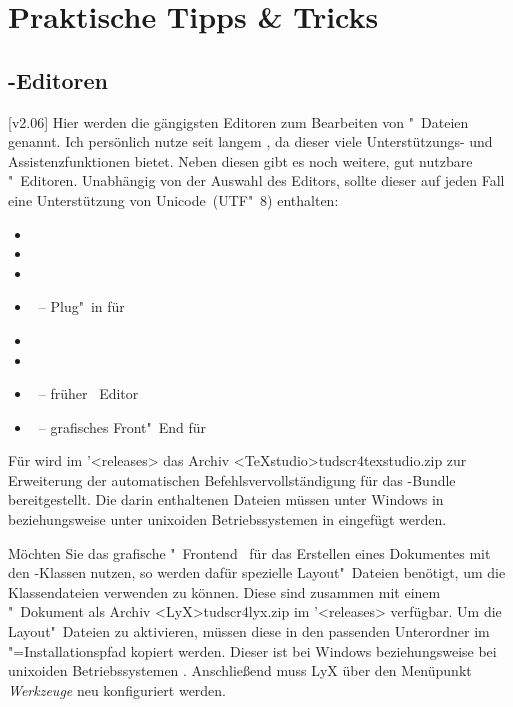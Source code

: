 \chapter{%
  Praktische Tipps \& Tricks%
  \label{sec:tips}%
}
\section{%
  -Editoren%
  \label{sec:tips:editor}%
}
%
[v2.06]%
Hier werden die gängigsten Editoren zum Bearbeiten von "~Dateien 
genannt. Ich persönlich nutze seit langem , da 
dieser viele Unterstützungs- und Assistenzfunktionen bietet. Neben diesen gibt 
es noch weitere, gut nutzbare "~Editoren. Unabhängig von der 
Auswahl des Editors, sollte dieser auf jeden Fall eine Unterstützung von 
Unicode~(UTF"~8) enthalten:
%
\begin{itemize}
\item {}
\item {}
\item {}
\item {}~-- Plug"~in für 
\item {}
\item {}
\item {}~-- früher ~Editor
\item {}~-- grafisches Front"~End für 
\end{itemize}
%
Für  wird im \GitHubRepo'<releases> das Archiv 
\GitHubDownload<TeXstudio>{tudscr4texstudio.zip} zur Erweiterung der 
automatischen Befehlsvervollständigung für das \TUDScript-Bundle 
bereitgestellt. Die darin enthaltenen Dateien müssen unter Windows in 
 beziehungsweise unter unixoiden 
Betriebssystemen in  eingefügt werden.

Möchten Sie das grafische "~Frontend~ 
für das Erstellen eines Dokumentes mit den \TUDScript-Klassen nutzen, so werden 
dafür spezielle Layout"~Dateien benötigt, um die Klassendateien verwenden zu 
können. Diese sind zusammen mit einem "~Dokument als 
Archiv \GitHubDownload<LyX>{tudscr4lyx.zip} im \GitHubRepo'<releases> 
verfügbar. Um die Layout"~Dateien zu aktivieren, müssen diese in den passenden 
Unterordner im "=Installationspfad kopiert werden. 
Dieser ist bei Windows
beziehungsweise bei unixoiden Betriebssystemen .
Anschließend muss LyX über den Menüpunkt \emph{Werkzeuge} neu konfiguriert 
werden. 



